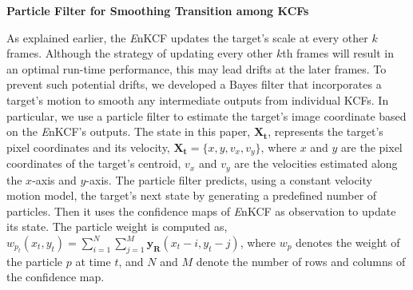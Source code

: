 \documentclass[10pt,twocolumn,letterpaper]{article}
\begin{document}
\textbf{Particle Filter for Smoothing Transition among KCFs}

As explained earlier, the {\it E}nKCF updates the target's scale
at every other $k$ frames. Although the strategy of updating every other 
$k$th frames will result in an optimal run-time performance, this may lead 
drifts at the later frames. To prevent such potential drifts, we developed a Bayes
filter that incorporates a target's motion to smooth any intermediate
outputs from individual KCFs. In particular, we use a particle filter
to estimate the target's image coordinate based on the {\it E}nKCF's
outputs. The state in this paper, $\mathbf{X_{t}}$, represents the
target's pixel coordinates and its velocity, $\mathbf{X_{t}} = \lbrace
x, y, v_{x}, v_{y} \rbrace$, where $x$ and $y$ are the pixel
coordinates of the target's centroid, $v_x$ and $v_y$ are the velocities
estimated along the $x$-axis and $y$-axis. The particle filter
predicts, using a constant velocity motion model, the target's next
state by generating a predefined number of particles. Then it uses the
confidence maps of {\it E}nKCF as observation to update its state. The
particle weight is computed as, $w_{p_{t}}(x_{t},y_{t}) =
\sum_{i=1}^{N}\sum_{j=1}^{M} \mathbf{y_{R}}(x_{t}-i,y_{t}-j)$, where
$w_{p}$ denotes the weight of the particle $p$ at time $t$, and $N$
and $M$ denote the number of rows and columns of the confidence map.
\end{document}
